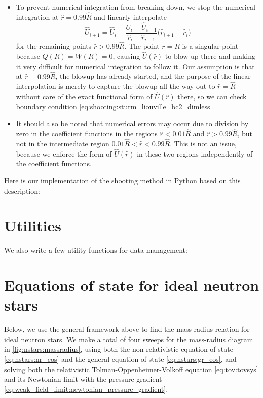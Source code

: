 \begin{itemize}
\begin{subequations}
      \end{subequations}
\item To prevent numerical integration from breaking down, we stop the numerical integration at $\hat{r} = 0.99 \hat{R}$ and linearly interpolate
      \begin{equation}
          \hat{U}_{i+1} = \hat{U}_i + \frac{\hat{U}_i - \hat{U}_{i-1}}{\hat{r}_i - \hat{r}_{i-1}} \Big( \hat{r}_{i+1} - \hat{r}_i \Big)
      \end{equation}
      for the remaining points $\hat{r} > 0.99 \hat{R}$.
      The point $r=R$ is a singular point because $Q(R) = W(R) = 0$, causing $\hat{U}(\hat{r})$ to blow up there and making it very difficult for numerical integration to follow it.
      Our assumption is that at $\hat{r} = 0.99 \hat{R}$, the blowup has already started, and the purpose of the linear interpolation is merely to capture the blowup all the way out to $\hat{r}=\hat{R}$ without care of the exact functional form of $\hat{U}(\hat{r})$ there, so we can check boundary condition \eqref{eq:shooting:sturm_liouville_bc2_dimless}.
\item It should also be noted that numerical errors may occur due to division by zero in the coefficient functions in the regions $\hat{r} < 0.01 \hat{R}$ and $\hat{r} > 0.99 \hat{R}$, but not in the intermediate region $0.01 \hat{R} < \hat{r} < 0.99 \hat{R}$.
      This is not an issue, because we enforce the form of $\hat{U}(\hat{r})$ in these two regions independently of the coefficient functions.
\end{itemize}

Here is our implementation of the shooting method in Python based on this description:


\section{Utilities}

We also write a few utility functions for data management:


\section{Equations of state for ideal neutron stars}
\label{sec:num:nstars}

Below, we use the general framework above to find the mass-radius relation for ideal neutron stars.
We make a total of four sweeps for the mass-radius diagram in \cref{fig:nstars:massradius}, using both the non-relativistic equation of state \eqref{eq:nstars:nr_eos} and the general equation of state \eqref{eq:nstars:gr_eos}, and solving both the relativistic Tolman-Oppenheimer-Volkoff equation \eqref{eq:tov:tovsys} and its Newtonian limit with the pressure gradient \eqref{eq:weak_field_limit:newtonian_pressure_gradient}.

